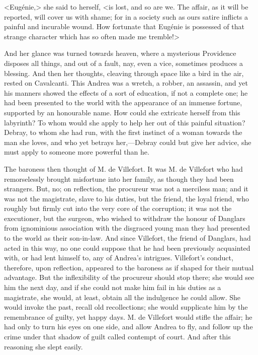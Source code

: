  <Eugénie,> she said to herself, <is lost, and so are we. The affair, as it will be reported, will cover us with shame; for in a society such as ours satire inflicts a painful and incurable wound. How fortunate that Eugénie is possessed of that strange character which has so often made me tremble!> 

 And her glance was turned towards heaven, where a mysterious Providence disposes all things, and out of a fault, nay, even a vice, sometimes produces a blessing. And then her thoughts, cleaving through space like a bird in the air, rested on Cavalcanti. This Andrea was a wretch, a robber, an assassin, and yet his manners showed the effects of a sort of education, if not a complete one; he had been presented to the world with the appearance of an immense fortune, supported by an honourable name. How could she extricate herself from this labyrinth? To whom would she apply to help her out of this painful situation? Debray, to whom she had run, with the first instinct of a woman towards the man she loves, and who yet betrays her,—Debray could but give her advice, she must apply to someone more powerful than he. 

 The baroness then thought of M. de Villefort. It was M. de Villefort who had remorselessly brought misfortune into her family, as though they had been strangers. But, no; on reflection, the procureur was not a merciless man; and it was not the magistrate, slave to his duties, but the friend, the loyal friend, who roughly but firmly cut into the very core of the corruption; it was not the executioner, but the surgeon, who wished to withdraw the honour of Danglars from ignominious association with the disgraced young man they had presented to the world as their son-in-law. And since Villefort, the friend of Danglars, had acted in this way, no one could suppose that he had been previously acquainted with, or had lent himself to, any of Andrea's intrigues. Villefort's conduct, therefore, upon reflection, appeared to the baroness as if shaped for their mutual advantage. But the inflexibility of the procureur should stop there; she would see him the next day, and if she could not make him fail in his duties as a magistrate, she would, at least, obtain all the indulgence he could allow. She would invoke the past, recall old recollections; she would supplicate him by the remembrance of guilty, yet happy days. M. de Villefort would stifle the affair; he had only to turn his eyes on one side, and allow Andrea to fly, and follow up the crime under that shadow of guilt called contempt of court. And after this reasoning she slept easily. 

